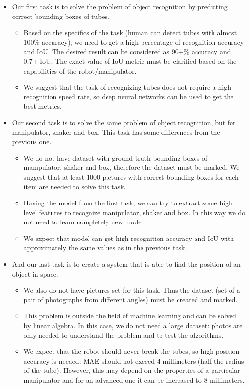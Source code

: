 \begin{itemize}
	\item Our first task is to solve the problem of object recognition by
	predicting correct bounding boxes of tubes.
	
	\begin{itemize}
		\item Based on the specifics of the task (human can detect tubes with almost 100\% accuracy), we need to get a high percentage of recognition accuracy and IoU. The desired result can be considered as 90+\% accuracy and 0.7+ IoU. The exact value of IoU metric must be clarified based on the capabilities of the robot/manipulator.
		
		\item We suggest that the task of recognizing tubes does not require a high recognition speed rate, so deep neural networks can be used to get the best metrics.
	\end{itemize}
	
	\item Our second task is to solve the same problem of object recognition, but for manipulator, shaker and box. This task has some differences from the previous one.
	
	\begin{itemize}
		\item We do not have dataset with ground truth bounding boxes of manipulator, shaker and box, therefore the dataset must be marked. We suggest that at least 1000 pictures with correct bounding boxes for each item are needed to solve this task.
		
		\item Having the model from the first task, we can try to extract some high level features to recognize manipulator, shaker and box. In this way we do not need to learn completely new model. 
		
		\item We expect that model can get high recognition accuracy and IoU with approximately the same values as in the previous task.
	\end{itemize}
	
	\item And our last task is to create a system that is able to find the position of an object in space.
	\begin{itemize}
		\item We also do not have pictures set for this task. Thus the dataset (set of a pair of photographs from different angles) must be created and marked. 
		\item This problem is outside the field of machine learning and can be solved by linear algebra. In this case, we do not need a large dataset: photos are only needed to understand the problem and to test the algorithms.
		\item We expect that the robot should never break the tubes, so high position accuracy is needed: MAE should not exceed 4 millimeters (half the radius of the tube). However, this may depend on the properties of a particular manipulator and for an advanced one it can be increased to 8 millimeters.
	\end{itemize}
\end{itemize} 
